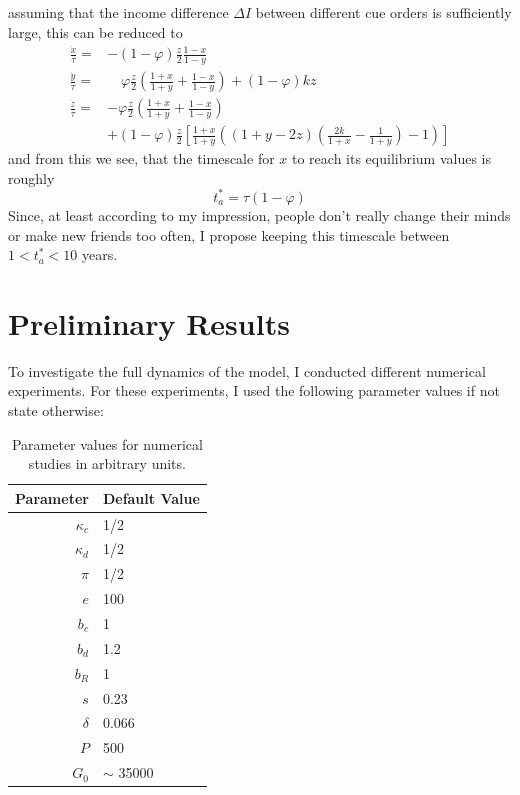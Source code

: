 assuming that the income difference $\Delta I$ between different cue orders is sufficiently large, this can be reduced to
\begin{align}
	\frac{\dot{x}}{\tau} =& -(1-\varphi)\frac{z}{2}\frac{1-x}{1-y} \\
\frac{\dot{y}}{\tau} =& \quad \varphi\frac{z}{2}\left( \frac{1+x}{1+y} + \frac{1-x}{1-y} \right) + (1-\varphi)kz \\
	\frac{\dot{z}}{\tau} =& -\varphi\frac{z}{2}\left( \frac{1+x}{1+y} + \frac{1-x}{1-y} \right) \nonumber \\
	& + (1-\varphi)\frac{z}{2} \left[ \frac{1+x}{1+y} \left( (1+y-2z)\left( \frac{2k}{1+x}-\frac{1}{1+y} \right)-1 \right) \right]
	\label{avm_ode_reduced}
\end{align}
and from this we see, that the timescale for $x$ to reach its equilibrium values is roughly 
\begin{equation}
	t_a^* = \tau(1-\varphi)
	\label{avm_timescale}
\end{equation}
Since, at least according to my impression, people don't really change their minds or make new friends too often, I propose keeping this timescale between $1<t_a^*<10$ years.

\section{Preliminary Results}

To investigate the full dynamics of the model, I conducted different numerical experiments. For these experiments, I used the following parameter values if not state otherwise:

\begin{table}[H]
	\centering
	\begin{tabular}{r|l}
		Parameter & Default Value \\\hline
		$\kappa_c$ & 1/2 \\
		$\kappa_d$ & 1/2 \\
		$\pi$ & 1/2 \\
		$e$ & 100 \\
		$b_c$ & 1 \\
		$b_d$ & 1.2 \\
		$b_R$ & 1 \\
		$s$ & 0.23 \\
		$\delta $ & 0.066 \\
		$P$ & 500 \\
		$G_0$ & $\sim$ 35000 \\
	\end{tabular}
	\caption{Parameter values for numerical studies in arbitrary units.}
	\label{tab:parameter_values}
\end{table}

